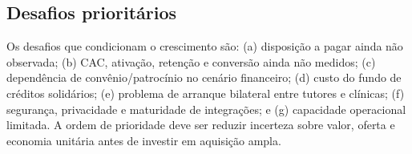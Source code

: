 \subsection{Desafios prioritários}
Os desafios que condicionam o crescimento são: (a) disposição a pagar ainda não observada; (b) CAC, ativação, retenção e conversão ainda não medidos; (c) dependência de convênio/patrocínio no cenário financeiro; (d) custo do fundo de créditos solidários; (e) problema de arranque bilateral entre tutores e clínicas; (f) segurança, privacidade e maturidade de integrações; e (g) capacidade operacional limitada. A ordem de prioridade deve ser reduzir incerteza sobre valor, oferta e economia unitária antes de investir em aquisição ampla.